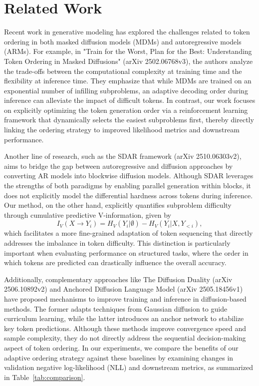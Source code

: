 \documentclass{article}
\begin{document}
\section{Related Work}
Recent work in generative modeling has explored the challenges related to token ordering in both masked diffusion models (MDMs) and autoregressive models (ARMs). For example, in "Train for the Worst, Plan for the Best: Understanding Token Ordering in Masked Diffusions" (arXiv 2502.06768v3), the authors analyze the trade-offs between the computational complexity at training time and the flexibility at inference time. They emphasize that while MDMs are trained on an exponential number of infilling subproblems, an adaptive decoding order during inference can alleviate the impact of difficult tokens. In contrast, our work focuses on explicitly optimizing the token generation order via a reinforcement learning framework that dynamically selects the easiest subproblems first, thereby directly linking the ordering strategy to improved likelihood metrics and downstream performance.

Another line of research, such as the SDAR framework (arXiv 2510.06303v2), aims to bridge the gap between autoregressive and diffusion approaches by converting AR models into blockwise diffusion models. Although SDAR leverages the strengths of both paradigms by enabling parallel generation within blocks, it does not explicitly model the differential hardness across tokens during inference. Our method, on the other hand, explicitly quantifies subproblem difficulty through cumulative predictive V-information, given by 
\[
I_V(X \to Y_i) = H_V(Y_i|\emptyset) - H_V(Y_i|X, Y_{<i}),
\]
which facilitates a more fine-grained adaptation of token sequencing that directly addresses the imbalance in token difficulty. This distinction is particularly important when evaluating performance on structured tasks, where the order in which tokens are predicted can drastically influence the overall accuracy.

Additionally, complementary approaches like The Diffusion Duality (arXiv 2506.10892v2) and Anchored Diffusion Language Model (arXiv 2505.18456v1) have proposed mechanisms to improve training and inference in diffusion-based methods. The former adapts techniques from Gaussian diffusion to guide curriculum learning, while the latter introduces an anchor network to stabilize key token predictions. Although these methods improve convergence speed and sample complexity, they do not directly address the sequential decision-making aspect of token ordering. In our experiments, we compare the benefits of our adaptive ordering strategy against these baselines by examining changes in validation negative log-likelihood (NLL) and downstream metrics, as summarized in Table~\ref{tab:comparison}.
\end{document}
